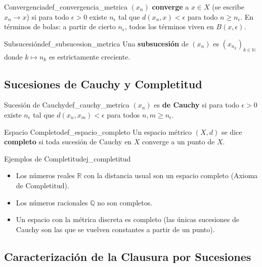\documentclass[11pt, a4paper]{article}
\begin{document}
\begin{definicion}{Convergencia}{def_convergencia_metrica}
$(x_n)$ \textbf{converge} a $x \in X$ (se escribe $x_n \to x$) si para todo $\epsilon > 0$ existe
$n_\epsilon$ tal que $d(x_n, x) < \epsilon$ para todo $n \ge n_\epsilon$. En términos de bolas: a
partir de cierto $n_\epsilon$, todos los términos viven en $B(x, \epsilon)$.
\end{definicion}

\begin{definicion}{Subsucesión}{def_subsucesion_metrica}
Una \textbf{subsucesión} de $(x_n)$ es $(x_{n_k})_{k \in \mathbb{N}}$ donde $k \mapsto n_k$ es
estrictamente creciente.
\end{definicion}

\subsection{Sucesiones de Cauchy y Completitud}

\begin{definicion}{Sucesión de Cauchy}{def_cauchy_metrica}
$(x_n)$ es \textbf{de Cauchy} si para todo $\epsilon > 0$ existe $n_\epsilon$ tal que
$d(x_n, x_m) < \epsilon$ para todos $n, m \ge n_\epsilon$.
\end{definicion}

\begin{definicion}{Espacio Completo}{def_espacio_completo}
Un espacio métrico $(X, d)$ se dice \textbf{completo} si toda sucesión de Cauchy en $X$ converge a un
punto de $X$.
\end{definicion}

\begin{ejemplo}{Ejemplos de Completitud}{ej_completitud}
\begin{itemize}
    \item Los números reales $\mathbb{R}$ con la distancia usual son un espacio completo (Axioma de
    Completitud).
    \item Los números racionales $\mathbb{Q}$ no son completos.
    \item Un espacio con la métrica discreta es completo (las únicas sucesiones de Cauchy son las
    que se vuelven constantes a partir de un punto).
\end{itemize}
\end{ejemplo}

\subsection{Caracterización de la Clausura por Sucesiones}
\end{document}

